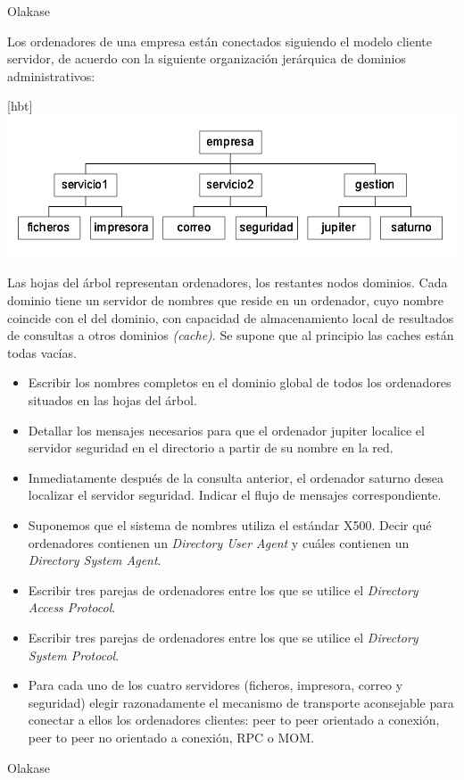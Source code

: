 \begin{problem}[19]
  Olakase

  \end{problem}

  \begin{problem}[20]
  Los ordenadores de una empresa están conectados siguiendo el modelo cliente
servidor, de acuerdo con la siguiente organización jerárquica de dominios
administrativos:
\begin{center}[hbt]
\includegraphics[width=1\textwidth]{img/si2-t4-ej-dom2.png}
\end{center}

   Las hojas del árbol representan ordenadores, los restantes nodos
dominios. Cada dominio tiene un servidor de nombres que reside en un
ordenador, cuyo nombre coincide con el del dominio, con capacidad de
almacenamiento local de resultados de consultas a otros dominios \textit{(cache)}. Se supone que al principio las caches están todas vacías.
  \begin{itemize}
    \item Escribir los nombres completos en el dominio global de todos los ordenadores
    situados en las hojas del árbol.
    \item Detallar los mensajes necesarios para que el ordenador jupiter localice
    el servidor seguridad en el directorio a partir de su nombre en la red.
    \item Inmediatamente después de la consulta anterior, el
ordenador saturno desea localizar el servidor seguridad. Indicar el
flujo de mensajes correspondiente.
    \item Suponemos que el sistema de nombres utiliza el estándar X500. Decir qué ordenadores contienen un \textit{Directory User Agent} y cuáles contienen un \textit{Directory System Agent}.
    \item Escribir tres parejas de ordenadores entre los que se utilice el \textit{Directory Access Protocol}.
    \item Escribir tres parejas de ordenadores entre los que se utilice el \textit{Directory System Protocol}.
    \item Para cada uno de los cuatro servidores (ficheros,
impresora, correo y seguridad) elegir razonadamente el mecanismo de
transporte aconsejable para conectar a ellos los ordenadores clientes:
peer to peer orientado a conexión, peer to peer no orientado a conexión,
 RPC o MOM.
  \end{itemize}
\solution
Olakase

\end{problem}